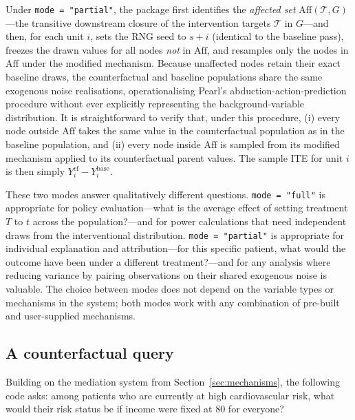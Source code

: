 \documentclass[12pt]{article}
\newcommand{\code}[1]{\texttt{#1}}
\begin{document}
Under \code{mode = "partial"}, the package first identifies the \emph{affected set}
$\mathrm{Aff}(\mathcal{T}, G)$---the transitive downstream closure of the
intervention targets $\mathcal{T}$ in $G$---and then, for each unit $i$, sets the
RNG seed to $s + i$ (identical to the baseline pass), freezes the drawn values for
all nodes \emph{not} in $\mathrm{Aff}$, and resamples only the nodes in
$\mathrm{Aff}$ under the modified mechanism. Because unaffected nodes retain their
exact baseline draws, the counterfactual and baseline populations share the same
exogenous noise realisations, operationalising Pearl's abduction-action-prediction
procedure \citep{pearl2009causality} without ever explicitly representing the
background-variable distribution. It is straightforward to verify that, under this
procedure, (i) every node outside $\mathrm{Aff}$ takes the same value in the
counterfactual population as in the baseline population, and (ii) every node inside
$\mathrm{Aff}$ is sampled from its modified mechanism applied to its
counterfactual parent values. The sample ITE for unit $i$ is then simply
$Y_i^\mathrm{cf} - Y_i^\mathrm{base}$.

These two modes answer qualitatively different questions. \code{mode = "full"} is
appropriate for policy evaluation---what is the average effect of setting treatment
$T$ to $t$ across the population?---and for power calculations that need
independent draws from the interventional distribution. \code{mode = "partial"} is
appropriate for individual explanation and attribution---for this specific patient,
what would the outcome have been under a different treatment?---and for any
analysis where reducing variance by pairing observations on their shared exogenous
noise is valuable. The choice between modes does not depend on the variable types
or mechanisms in the system; both modes work with any combination of pre-built and
user-supplied mechanisms.

\subsection{A counterfactual query}

Building on the mediation system from Section~\ref{sec:mechanisms}, the following
code asks: among patients who are currently at high cardiovascular risk, what would
their risk status be if income were fixed at 80 for everyone?

\end{document}
